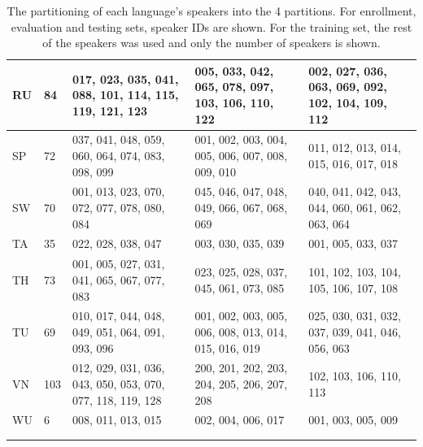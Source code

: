 \documentclass[bsc,frontabs,twoside,singlespacing,parskip,deptreport]{infthesis}
\begin{document}
{{\begin{sc}
\begin{longtable}{p{0.5cm}|p{0.8cm}|p{3.9cm}|p{3.5cm}|p{3.5cm}}
        RU & 84 & 017, 023, 035, 041, 088, 101, 114, 115, 119, 121, 123 & 005, 033, 042, 065, 078, 097, 103, 106, 110, 122 & 002, 027, 036, 063, 069, 092, 102, 104, 109, 112 \\
        \hline
        SP & 72 & 037, 041, 048, 059, 060, 064, 074, 083, 098, 099 & 001, 002, 003, 004, 005, 006, 007, 008, 009, 010 & 011, 012, 013, 014, 015, 016, 017, 018 \\
        \hline
        SW & 70 & 001, 013, 023, 070, 072, 077, 078, 080, 084 & 045, 046, 047, 048, 049, 066, 067, 068, 069 & 040, 041, 042, 043, 044, 060, 061, 062, 063, 064 \\
        \hline
        TA & 35 & 022, 028, 038, 047 & 003, 030, 035, 039 & 001, 005, 033, 037 \\
        \hline
        TH & 73 & 001, 005, 027, 031, 041, 065, 067, 077, 083 & 023, 025, 028, 037, 045, 061, 073, 085 & 101, 102, 103, 104, 105, 106, 107, 108 \\
        \hline
        TU & 69 & 010, 017, 044, 048, 049, 051, 064, 091, 093, 096 & 001, 002, 003, 005, 006, 008, 013, 014, 015, 016, 019 & 025, 030, 031, 032, 037, 039, 041, 046, 056, 063 \\
        \hline
        VN & 103 & 012, 029, 031, 036, 043, 050, 053, 070, 077, 118, 119, 128 & 200, 201, 202, 203, 204, 205, 206, 207, 208 & 102, 103, 106, 110, 113 \\
        \hline
        WU & 6 & 008, 011, 013, 015 & 002, 004, 006, 017 & 001, 003, 005, 009 \\
        \hline
        \multicolumn{3}{l}{} \\[-7pt]
        \caption{The partitioning of each language's speakers into the 4 partitions. For enrollment, evaluation and testing sets, speaker IDs are shown. For the training set, the rest of the speakers was used and only the number of speakers is shown.}
        \label{tab:partitioning}
      \end{longtable}
    \end{sc}
  }
}
\end{document}
